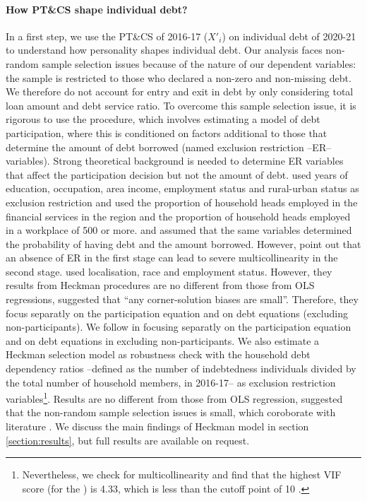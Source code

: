 \documentclass[a4paper, 11pt, onecolumn]{article}
\begin{document}
\paragraph{How PT\&CS shape individual debt?}
In a first step, we use the PT\&CS of 2016-17 ($X'_{i}$) on individual debt of 2020-21 to understand how personality shapes individual debt.
Our analysis faces non-random sample selection issues because of the nature of our dependent variables: the sample is restricted to those who declared a non-zero and non-missing debt.
We therefore do not account for entry and exit in debt by only considering total loan amount and debt service ratio.
To overcome this sample selection issue, it is rigorous to use the \cite{Heckman1976} procedure, which involves estimating a model of debt participation, where this is conditioned on factors additional to those that determine the amount of debt
borrowed (named exclusion restriction --ER-- variables).
Strong theoretical background is needed to determine ER variables that affect the participation decision but not the amount of debt.
\cite{Cox1993} used years of education, occupation, area income, employment status and rural-urban status as exclusion restriction and \cite{Bertaut2002} used the proportion of household heads employed in the financial services in the region and the proportion of household heads employed in a workplace of 500 or more.
\cite{Duca1993} and \cite{Crook2001} assumed that the same variables determined the probability of having debt and the amount borrowed.
However, \cite{Lennox2011} point out that an absence of ER in the first stage can lead to severe multicollinearity in the second stage.
\cite{Rio2006} used localisation, race and employment status.
However, they results from Heckman procedures are no different from those from OLS regressions, suggested that ``any corner-solution biases are small''.
Therefore, they focus separatly on the participation equation and on debt equations (excluding non-participants).
We follow \cite{Rio2006} in focusing separatly on the participation equation and on debt equations in excluding non-participants.
We also estimate a Heckman selection model as robustness check with the household debt dependency ratios --defined as the number of indebtedness individuals divided by the total number of household members, in 2016-17-- as exclusion restriction variables\footnote{Nevertheless, we check for multicollinearity and find that the highest VIF score (for the ) is 4.33, which is less than the cutoff point of 10 \citep{Lennox2011}.}.
Results are no different from those from OLS regression, suggested that the non-random sample selection issues is small, which coroborate with literature \citep{Rio2006, Brown2014}.
We discuss the main findings of Heckman model in section \ref{section:results}, but full results are available on request.
\end{document}

